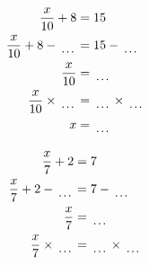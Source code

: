 \documentclass[12pt]{article}
\newcounter{minipagecount}
\begin{document}
\begin{multicols}{2}
\begin{minipage}[t]{0.45\textwidth}
    \raggedright %
    \begin{align*} %
        \frac{x}{10} + 8 &= 15\\
        \frac{x}{10} + 8 - \dotuline{\hspace{5mm}} &= 15 - \dotuline{\hspace{5mm}}\\
        \frac{x}{10} &= \dotuline{\hspace{5mm}}\\
        \frac{x}{10} \times\dotuline{\hspace{5mm}} &= \dotuline{\hspace{5mm}} \times\dotuline{\hspace{5mm}}\\
        x &= \dotuline{\hspace{5mm}}\\
    \end{align*}
\end{minipage} %
\noindent{(\theminipagecount)}\hspace{0.1mm} %
\begin{minipage}[t]{0.45\textwidth} %
    \vspace{-26pt}  %
    \raggedright %
    \begin{align*} %
        \frac{x}{7} + 2 &= 7\\
        \frac{x}{7} + 2 - \dotuline{\hspace{5mm}} &= 7 - \dotuline{\hspace{5mm}}\\
        \frac{x}{7} &= \dotuline{\hspace{5mm}}\\
        \frac{x}{7} \times\dotuline{\hspace{5mm}} &= \dotuline{\hspace{5mm}} \times\dotuline{\hspace{5mm}}\\

\end{align*}
\end{minipage}
\end{multicols}
\end{document}
